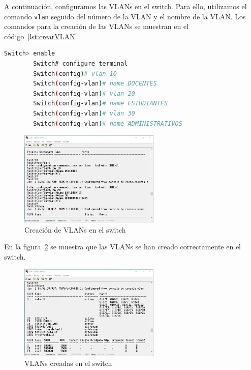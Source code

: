     A continuación, configuramos las VLANs en el switch. Para ello, utilizamos el comando \texttt{vlan} seguido del número de la VLAN y el nombre de la VLAN. Los comandos para la creación de las VLANs se muestran en el código~\ref{lst:crearVLAN}.

    \begin{lstlisting}[language=bash, caption={Creación de VLANs en el switch}, label={lst:crearVLAN}]
        Switch> enable
        Switch# configure terminal
        Switch(config)# vlan 10
        Switch(config-vlan)# name DOCENTES
        Switch(config-vlan)# vlan 20
        Switch(config-vlan)# name ESTUDIANTES
        Switch(config-vlan)# vlan 30
        Switch(config-vlan)# name ADMINISTRATIVOS
    \end{lstlisting}

    \begin{figure}[H]
        \centering
        \includegraphics[width=0.6\textwidth]{img/crear_VLAN.png}
        \caption{Creación de VLANs en el switch}
        \label{fig:crearVLAN}
    \end{figure}

    En la figura~\ref{fig:Vlan_creadas} se muestra que las VLANs se han creado correctamente en el switch.

    \begin{figure}[H]
        \centering
        \includegraphics[width=0.6\textwidth]{img/Vlan_creadas.png}
        \caption{VLANs creadas en el switch}
        \label{fig:Vlan_creadas}
    \end{figure}

